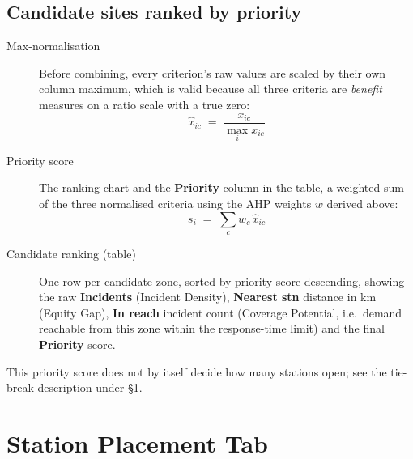 \documentclass[11pt]{article}
\begin{document}
\subsection{Candidate sites ranked by priority}
\begin{description}
  \item[Max-normalisation] Before combining, every criterion's raw values are
    scaled by their own column maximum, which is valid because all three
    criteria are \emph{benefit} measures on a ratio scale with a true zero:
    \[
      \hat x_{ic} \;=\; \frac{x_{ic}}{\max_i x_{ic}}
    \]
  \item[Priority score] The ranking chart and the \textbf{Priority} column in
    the table, a weighted sum of the three normalised criteria using the AHP
    weights $w$ derived above:
    \[
      s_i \;=\; \sum_{c} w_c\,\hat x_{ic}
    \]
  \item[Candidate ranking (table)] One row per candidate zone, sorted by
    priority score descending, showing the raw \textbf{Incidents}
    (Incident Density), \textbf{Nearest stn} distance in km (Equity Gap),
    \textbf{In reach} incident count (Coverage Potential, i.e.\ demand
    reachable from this zone within the response-time limit) and the final
    \textbf{Priority} score.
\end{description}
This priority score does not by itself decide how many stations open; see
the tie-break description under \S\ref{sec:placement}.

\section{Station Placement Tab}
\label{sec:placement}
\end{document}
